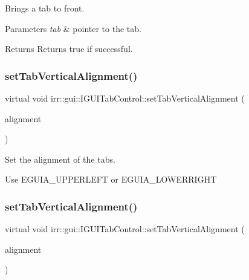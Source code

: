 Brings a tab to front. 


\begin{DoxyParams}{Parameters}
{\em tab} & pointer to the tab. \\
\hline
\end{DoxyParams}
\begin{DoxyReturn}{Returns}
Returns true if successful. 
\end{DoxyReturn}
\mbox{\label{classirr_1_1gui_1_1IGUITabControl_a5481d1c15605d00654c12581842ad311}} 
\subsubsection{\texorpdfstring{set\+Tab\+Vertical\+Alignment()}{setTabVerticalAlignment()}\hspace{0.1cm}{\footnotesize\ttfamily [1/2]}}
{\footnotesize\ttfamily virtual void irr\+::gui\+::\+I\+G\+U\+I\+Tab\+Control\+::set\+Tab\+Vertical\+Alignment (\begin{DoxyParamCaption}\item[{\hyperlink{namespaceirr_1_1gui_a19eb5fb40e67f108cb16aba922ddaa2d}{gui\+::\+E\+G\+U\+I\+\_\+\+A\+L\+I\+G\+N\+M\+E\+NT}}]{alignment }\end{DoxyParamCaption})\hspace{0.3cm}{\ttfamily [pure virtual]}}



Set the alignment of the tabs. 

Use E\+G\+U\+I\+A\+\_\+\+U\+P\+P\+E\+R\+L\+E\+FT or E\+G\+U\+I\+A\+\_\+\+L\+O\+W\+E\+R\+R\+I\+G\+HT \mbox{\label{classirr_1_1gui_1_1IGUITabControl_a5481d1c15605d00654c12581842ad311}} 
\subsubsection{\texorpdfstring{set\+Tab\+Vertical\+Alignment()}{setTabVerticalAlignment()}\hspace{0.1cm}{\footnotesize\ttfamily [2/2]}}
{\footnotesize\ttfamily virtual void irr\+::gui\+::\+I\+G\+U\+I\+Tab\+Control\+::set\+Tab\+Vertical\+Alignment (\begin{DoxyParamCaption}\item[{\hyperlink{namespaceirr_1_1gui_a19eb5fb40e67f108cb16aba922ddaa2d}{gui\+::\+E\+G\+U\+I\+\_\+\+A\+L\+I\+G\+N\+M\+E\+NT}}]{alignment }\end{DoxyParamCaption})\hspace{0.3cm}{\ttfamily [pure virtual]}}



